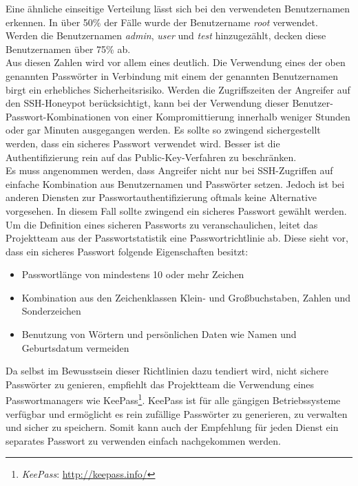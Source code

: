 Eine ähnliche einseitige Verteilung lässt sich bei den verwendeten Benutzernamen erkennen. In über 50\% der Fälle wurde der Benutzername \textit{root} verwendet. Werden die Benutzernamen \textit{admin}, \textit{user} und \textit{test} hinzugezählt, decken diese Benutzernamen über 75\% ab.\\

Aus diesen Zahlen wird vor allem eines deutlich. Die Verwendung eines der oben genannten Passwörter in Verbindung mit einem der genannten Benutzernamen birgt ein erhebliches Sicherheitsrisiko. Werden die Zugriffszeiten der Angreifer auf den SSH-Honeypot berücksichtigt, kann bei der Verwendung dieser Benutzer-Passwort-Kombinationen von einer Kompromittierung innerhalb weniger Stunden oder gar Minuten ausgegangen werden. Es sollte so zwingend sichergestellt werden, dass ein sicheres Passwort verwendet wird. Besser ist die Authentifizierung rein auf das Public-Key-Verfahren zu beschränken.\\

Es muss angenommen werden, dass Angreifer nicht nur bei SSH-Zugriffen auf einfache Kombination aus Benutzernamen und Passwörter setzen. Jedoch ist bei anderen Diensten zur Passwortauthentifizierung oftmals keine Alternative vorgesehen. In diesem Fall sollte zwingend ein sicheres Passwort gewählt werden. Um die Definition eines sicheren Passworts zu veranschaulichen, leitet das Projektteam aus der Passwortstatistik eine Passwortrichtlinie ab. Diese sieht vor, dass ein sicheres Passwort folgende Eigenschaften besitzt:

\begin{itemize}
\item Passwortlänge von mindestens 10 oder mehr Zeichen
\item Kombination aus den Zeichenklassen Klein- und Großbuchstaben, Zahlen und Sonderzeichen
\item Benutzung von Wörtern und persönlichen Daten wie Namen und Geburtsdatum vermeiden
\end{itemize}

Da selbst im Bewusstsein dieser Richtlinien dazu tendiert wird, nicht sichere Passwörter zu genieren, empfiehlt das Projektteam die Verwendung eines Passwortmanagers wie KeePass\footnote{ \textit{KeePass}: \url{http://keepass.info/}}. KeePass ist für alle gängigen Betriebssysteme verfügbar und ermöglicht es rein zufällige Passwörter zu generieren, zu verwalten und sicher zu speichern. Somit kann auch der Empfehlung für jeden Dienst ein separates Passwort zu verwenden einfach nachgekommen werden.

